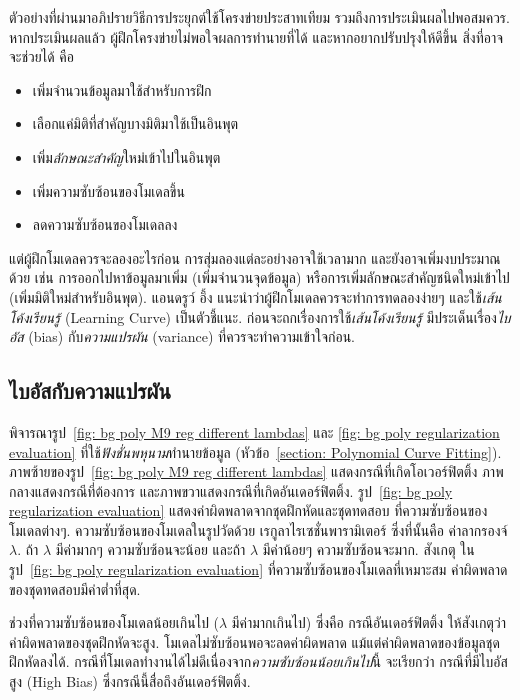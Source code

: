 ตัวอย่างที่ผ่านมาอภิปรายวิธีการประยุกต์ใช้โครงข่ายประสาทเทียม รวมถึงการประเมินผลไปพอสมควร.
หากประเมินผลแล้ว ผู้ฝึกโครงข่ายไม่พอใจผลการทำนายที่ได้ และหากอยากปรับปรุงให้ดีขึ้น
สิ่งที่อาจจะช่วยได้ คือ
\begin{itemize}
\item เพิ่มจำนวนข้อมูลมาใช้สำหรับการฝึก %
\item เลือกแค่มิติที่สำคัญบางมิติมาใช้เป็นอินพุต %
\item เพิ่ม\textit{ลักษณะสำคัญ}ใหม่เข้าไปในอินพุต %
\item เพิ่มความซับซ้อนของโมเดลขึ้น %
\item ลดความซับซ้อนของโมเดลลง %
\end{itemize}
แต่ผู้ฝึกโมเดลควรจะลองอะไรก่อน
การสุ่มลองแต่ละอย่างอาจใช้เวลามาก และยังอาจเพิ่มงบประมาณด้วย 
เช่น การออกไปหาข้อมูลมาเพิ่ม (เพิ่มจำนวนจุดข้อมูล) 
หรือการเพิ่มลักษณะสำคัญชนิดใหม่เข้าไป (เพิ่มมิติใหม่สำหรับอินพุต).
แอนดรูว์ อึ้ง\cite{Ng2013a} แนะนำว่าผู้ฝึกโมเดลควรจะทำการทดลองง่ายๆ 
และใช้\textit{เส้นโค้งเรียนรู้} (Learning Curve) เป็นตัวชี้แนะ.
ก่อนจะถกเรื่องการใช้\textit{เส้นโค้งเรียนรู้} มีประเด็นเรื่อง\textit{ไบอัส} (bias) กับ\textit{ความแปรผัน} (variance) ที่ควรจะทำความเข้าใจก่อน.

\subsection{ไบอัสกับความแปรผัน}
\label{ann tips: bias v.s. variance}
พิจารณารูป~\ref{fig: bg poly M9 reg different lambdas} และ 
\ref{fig: bg poly regularization evaluation}
ที่ใช้\textit{ฟังชั่นพหุนาม}ทำนายข้อมูล (หัวข้อ~\ref{section: Polynomial Curve Fitting}).
ภาพซ้ายของรูป~\ref{fig: bg poly M9 reg different lambdas} แสดงกรณีที่เกิดโอเวอร์ฟิตติ้ง 
ภาพกลางแสดงกรณีที่ต้องการ 
และภาพขวาแสดงกรณีที่เกิดอันเดอร์ฟิตติ้ง.
รูป~\ref{fig: bg poly regularization evaluation} แสดงค่าผิดพลาดจากชุดฝึกหัดและชุดทดสอบ 
ที่ความซับซ้อนของโมเดลต่างๆ. 
ความซับซ้อนของโมเดลในรูปวัดด้วย เรกูลาไรเซชั่นพารามิเตอร์ ซึ่งที่นั้นคือ ค่าลากรองจ์ $\lambda$.
ถ้า $\lambda$ มีค่ามากๆ ความซับซ้อนจะน้อย และถ้า $\lambda$ มีค่าน้อยๆ ความซับซ้อนจะมาก.
สังเกตุ ในรูป~\ref{fig: bg poly regularization evaluation} ที่ความซับซ้อนของโมเดลที่เหมาะสม ค่าผิดพลาดของชุดทดสอบมีค่าต่ำที่สุด.

ช่วงที่ความซับซ้อนของโมเดลน้อยเกินไป ($\lambda$ มีค่ามากเกินไป) ซึ่งคือ กรณีอันเดอร์ฟิตติ้ง 
ให้สังเกตุว่า ค่าผิดพลาดของชุดฝึกหัดจะสูง.
โมเดลไม่ซับซ้อนพอจะลดค่าผิดพลาด แม้แต่ค่าผิดพลาดของข้อมูลชุดฝึกหัดลงได้.
กรณีที่โมเดลทำงานได้ไม่ดีเนื่องจาก\textit{ความซับซ้อนน้อยเกินไป}นี้ จะเรียกว่า กรณีที่มีไบอัสสูง (High Bias) 
ซึ่งกรณีนี้สื่อถึงอันเดอร์ฟิตติ้ง.

